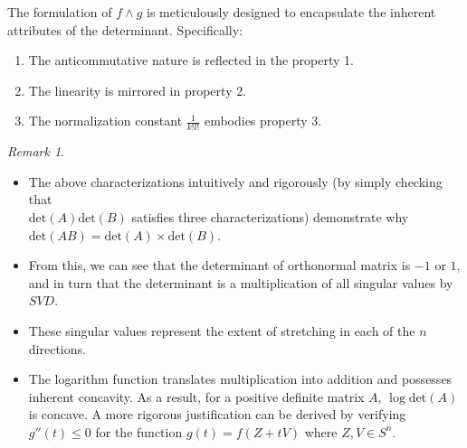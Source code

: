 \documentclass[11pt,reqno]{amsart}
\theoremstyle{remark}
\newtheorem{remark}[example]{Remark}
\begin{document}
  The formulation of $f\wedge g$ is meticulously designed to 
  encapsulate the inherent attributes of the determinant. Specifically:
  \begin{enumerate}
    \item The anticommutative nature is reflected in the property 1.
    \item The linearity is mirrored in property 2.
    \item The normalization constant $\frac{1}{k!l!}$ embodies property 3.
  \end{enumerate}
\begin{remark}
\begin{itemize}
 \item The above characterizations intuitively and rigorously (by simply checking that\\
  $\text{det}(A)\text{det}(B)$ satisfies three characterizations) demonstrate why\\
   $ \text{det}(AB) = \text{det}(A) \times \text{det}(B) $.
 \item From this, we can see that the determinant of orthonormal matrix is $-1$ or $1$, and in turn that the determinant is a multiplication of all singular values by $SVD$.
 \item These singular values represent the extent of stretching in each of the \( n \) directions.
 \item The logarithm function translates multiplication into addition and possesses inherent concavity. As a result, for a positive definite matrix \( A \), \( \log \text{det}(A) \) is concave. A more rigorous justification can be derived by verifying \( g''(t) \leq 0 \) for 
 the function \( g(t) = f(Z + tV) \) where \( Z, V \in S^n \).
\end{itemize}
\end{remark}
\end{document}
